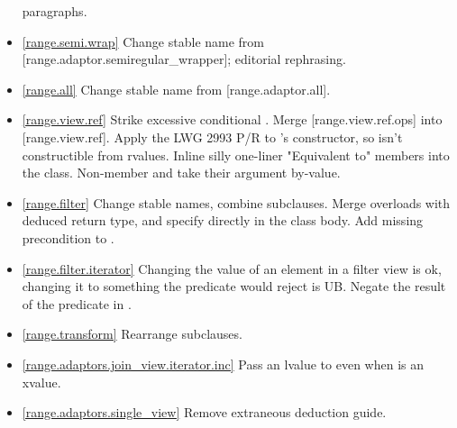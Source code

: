 \begin{itemize}
  paragraphs.
\item \ref{range.semi.wrap} Change stable name from
  [range.adaptor.semiregular_wrapper]; editorial rephrasing.
\item \ref{range.all} Change stable name from [range.adaptor.all].
\item \ref{range.view.ref} Strike excessive conditional .
  Merge [range.view.ref.ops] into [range.view.ref].
  Apply the LWG 2993 P/R to 's constructor, so
   isn't constructible from rvalues.
  Inline silly one-liner "\effects Equivalent to" members into the class.
  Non-member  and  take their argument by-value.
\item \ref{range.filter} Change stable names, combine subclauses.
  Merge  overloads with deduced return type,
  and specify directly in the class body.
  Add missing precondition to .
\item \ref{range.filter.iterator}
  Changing the value of an element in a filter view is ok, changing it to
  something the predicate would reject is UB.
  Negate the result of the predicate in .
\item \ref{range.transform} Rearrange subclauses.
\item \ref{range.adaptors.join_view.iterator.inc} Pass an lvalue to
   even when  is an xvalue.
\item \ref{range.adaptors.single_view} Remove extraneous 
  deduction guide.
\end{itemize}

